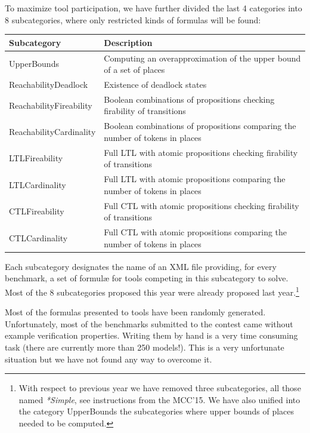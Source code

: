 \documentclass[10pt,english,a4paper]{article}
\makeatletter
\newcommand\ie               {i.e.\@\xspace}
\makeatother
\begin{document}
To maximize tool participation, we have further divided the last 4
categories into 8 subcategories, where only restricted kinds of formulas
will be found:

\begin{center}
\begin{tabular}{ll}
\toprule
Subcategory                       & Description \\
\midrule
UpperBounds                    & Computing an overapproximation of the upper bound of a set of places \\
\midrule
ReachabilityDeadlock           & Existence of deadlock states \\
ReachabilityFireability        & Boolean combinations of propositions checking firability of transitions \\
ReachabilityCardinality        & Boolean combinations of propositions comparing the number of tokens in places\\
\midrule
LTLFireability                 & Full LTL with atomic propositions checking firability of transitions \\
LTLCardinality                 & Full LTL with atomic propositions comparing the number of tokens in places \\
\midrule
CTLFireability                 & Full CTL with atomic propositions checking firability of transitions \\
CTLCardinality                 & Full CTL with atomic propositions comparing the number of tokens in places \\
\bottomrule
\end{tabular}
\end{center}

Each subcategory designates the
name of an XML file providing, for every benchmark, a set of formulæ for
tools competing in this subcategory to solve.
%
Most of the 8 subcategories proposed this year were already proposed last
year.\footnote{With respect to previous year we have removed three
subcategories, all those named \textit{*Simple}, see instructions from the
MCC'15. We have also unified into the category UpperBounds the subcategories
where upper bounds of places needed to be computed.}

Most of the formulas presented to tools have been randomly generated.
Unfortunately, most of the benchmarks submitted to the contest came without
example verification properties.
Writing them by hand is a very time consuming task (there are currently more
than 250 models!).
This is a very unfortunate situation but we have not found any way to
overcome it.
\end{document}
